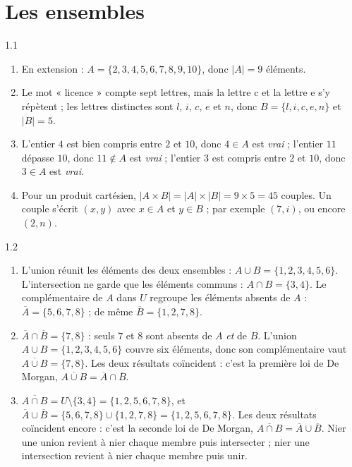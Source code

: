 \chapter{Les ensembles}

\begin{corrige}{1.1}
\begin{enumerate}
\item En extension : $A = \{2, 3, 4, 5, 6, 7, 8, 9, 10\}$, donc $|A| = 9$ éléments.
\item Le mot « licence » compte sept lettres, mais la lettre c et la lettre e s'y répètent ; les lettres distinctes sont $l$, $i$, $c$, $e$ et $n$, donc $B = \{l, i, c, e, n\}$ et $|B| = 5$.
\item L'entier $4$ est bien compris entre $2$ et $10$, donc $4 \in A$ est \emph{vrai} ; l'entier $11$ dépasse $10$, donc $11 \notin A$ est \emph{vrai} ; l'entier $3$ est compris entre $2$ et $10$, donc $3 \in A$ est \emph{vrai}.
\item Pour un produit cartésien, $|A \times B| = |A| \times |B| = 9 \times 5 = 45$ couples. Un couple s'écrit $(x, y)$ avec $x \in A$ et $y \in B$ ; par exemple $(7, i)$, ou encore $(2, n)$.
\end{enumerate}
\end{corrige}

\begin{corrige}{1.2}
\begin{enumerate}
\item L'union réunit les éléments des deux ensembles : $A \cup B = \{1, 2, 3, 4, 5, 6\}$. L'intersection ne garde que les éléments communs : $A \cap B = \{3, 4\}$. Le complémentaire de $A$ dans $U$ regroupe les éléments absents de $A$ : $\overline{A} = \{5, 6, 7, 8\}$ ; de même $\overline{B} = \{1, 2, 7, 8\}$.
\item $\overline{A} \cap \overline{B} = \{7, 8\}$ : seuls $7$ et $8$ sont absents de $A$ \emph{et} de $B$. L'union $A \cup B = \{1, 2, 3, 4, 5, 6\}$ couvre six éléments, donc son complémentaire vaut $\overline{A \cup B} = \{7, 8\}$. Les deux résultats coïncident : c'est la première loi de De Morgan, $\overline{A \cup B} = \overline{A} \cap \overline{B}$.
\item $\overline{A \cap B} = U \setminus \{3, 4\} = \{1, 2, 5, 6, 7, 8\}$, et $\overline{A} \cup \overline{B} = \{5, 6, 7, 8\} \cup \{1, 2, 7, 8\} = \{1, 2, 5, 6, 7, 8\}$. Les deux résultats coïncident encore : c'est la seconde loi de De Morgan, $\overline{A \cap B} = \overline{A} \cup \overline{B}$. Nier une union revient à nier chaque membre puis intersecter ; nier une intersection revient à nier chaque membre puis unir.
\end{enumerate}
\end{corrige}

